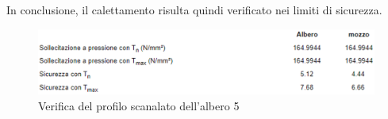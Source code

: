 In conclusione, il calettamento risulta quindi verificato nei limiti di sicurezza.
\begin{figure}[h]
    \centering
    \includegraphics[scale=0.5]{Immagini/RisultatiScanalato5.png}
    \caption{Verifica del profilo scanalato dell'albero 5}
    \label{fig:RisultatiScanalato5}
\end{figure}
